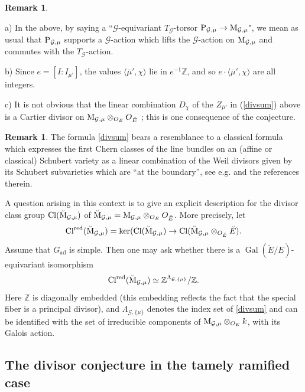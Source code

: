 \documentclass[reqno, 10pt]{amsart}
\makeatletter
\newcommand{\BZ}{\ensuremath{\mathbb {Z}}\xspace}
\newcommand{\CG}{\ensuremath{\mathcal {G}}\xspace}
\newcommand{\ad}{{\mathrm{ad}}}
\DeclareMathOperator{\Gal}{Gal}
\newcommand{\red}{\ensuremath{\mathrm{red}}\xspace}
\theoremstyle{definition}
\newtheorem{remark}[subsubsection]{Remark}
\numberwithin{equation}{subsection}
\numberwithin{subsubsection}{subsection}
\renewcommand{\to}{%
   \ifbool{@display}{\longrightarrow}{\rightarrow}%
   }
\newcommand{\br}{\breve}
\newcommand{\Mloc}{{\rm M}}
\makeatother
\begin{document}
 
\begin{remark}\label{rem:coef}
{\rm a) In the above, by saying a ``$\CG$-equivariant $T_\CG$-torsor ${\rm P}_{\CG,\mu}\to \Mloc_{\CG,\mu}$", we mean as usual that 
${\rm P}_{\CG,\mu}$ supports a $\CG $-action which lifts the $\CG $-action on $\Mloc_{\CG,\mu}$ and commutes with the 
$T_\CG $-action.

b) Since $e=[I:I_{\mu'}]$, the values $\langle \bar\mu',\chi\rangle$ lie in $e^{-1}\BZ$, and so $e\cdot \langle \bar\mu',\chi\rangle$ are all integers.

c)  It is not obvious that the linear combination $D_\chi$ of the $Z_{\bar\mu'}$ in (\ref{divsum}) above is a Cartier divisor on $\Mloc_{\CG,\mu}\otimes_{O_E}O_{\br E}$ ; this is one consequence of the conjecture.}
\end{remark}

\begin{remark}\label{rem:Slodowy}
  The formula \eqref{divsum} bears a resemblance to a classical formula which expresses the first Chern classes of the line bundles on an (affine or classical) Schubert variety as a linear combination of the Weil divisors given by its Schubert subvarieties which are ``at the boundary'', see e.g. \cite[Cor. 3]{Slodowy} and the references therein. 
  
A question arising in this context is to give an explicit description for the divisor class group ${\rm Cl}(\br\Mloc_{\CG,\mu})$ of  $\br\Mloc_{\CG,\mu}=\Mloc_{\CG,\mu}\otimes_{O_E} O_{\br E}$. More precisely, let 
  \[{\rm Cl}^\red(\br\Mloc_{\CG,\mu})=\ker({\rm Cl}(\br\Mloc_{\CG,\mu})\to {\rm Cl}(\br\Mloc_{\CG,\mu}\otimes_{O_{\br E}}\br E).
  \]
   Assume that  $G_\ad$  is simple.  Then one may ask whether there is a $\Gal(\br E/ E)$-equivariant isomorphism 
  \begin{equation}
  {\rm Cl}^\red(\br\Mloc_{\CG,\mu})\simeq \BZ^{\Lambda_{\CG,\{\mu\}}}/\BZ . 
  \end{equation}
  Here $\BZ$ is diagonally embedded (this embedding reflects the fact that the special fiber is a principal divisor), and $\Lambda_{\CG,\{\mu\}}$ denotes the index set of \eqref{divsum} and can be identified with the set of irreducible components of $\Mloc_{\CG,\mu}\otimes_{O_E} k$, with its Galois action. 
\end{remark}
 

\subsection{The divisor conjecture in the tamely ramified case}
\end{document}
